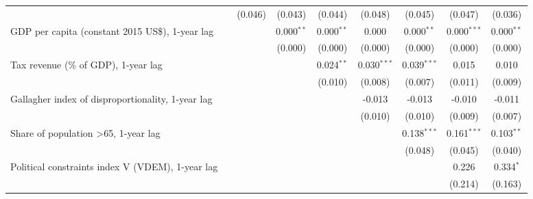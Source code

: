 \begin{table}[htbp]
\begin{tabular}{lcccccccc}
                                                                                                 &         & (0.046) & (0.043)      & (0.044)       & (0.048)       & (0.045)       & (0.047)       & (0.036)\\   
      GDP per capita (constant 2015 US\$), 1-year lag                                            &         &         & 0.000$^{**}$ & 0.000$^{**}$  & 0.000         & 0.000$^{**}$  & 0.000$^{***}$ & 0.000$^{**}$\\   
                                                                                                 &         &         & (0.000)      & (0.000)       & (0.000)       & (0.000)       & (0.000)       & (0.000)\\   
      Tax revenue (\% of GDP), 1-year lag                                                        &         &         &              & 0.024$^{**}$  & 0.030$^{***}$ & 0.039$^{***}$ & 0.015         & 0.010\\   
                                                                                                 &         &         &              & (0.010)       & (0.008)       & (0.007)       & (0.011)       & (0.009)\\   
      Gallagher index of disproportionality, 1-year lag                                          &         &         &              &               & -0.013        & -0.013        & -0.010        & -0.011\\   
                                                                                                 &         &         &              &               & (0.010)       & (0.010)       & (0.009)       & (0.007)\\   
      Share of population >65, 1-year lag                                                        &         &         &              &               &               & 0.138$^{***}$ & 0.161$^{***}$ & 0.103$^{**}$\\   
                                                                                                 &         &         &              &               &               & (0.048)       & (0.045)       & (0.040)\\   
      Political constraints index V (VDEM), 1-year lag                                           &         &         &              &               &               &               & 0.226         & 0.334$^{*}$\\   
                                                                                                 &         &         &              &               &               &               & (0.214)       & (0.163)\\   

\end{tabular}
\end{table}
